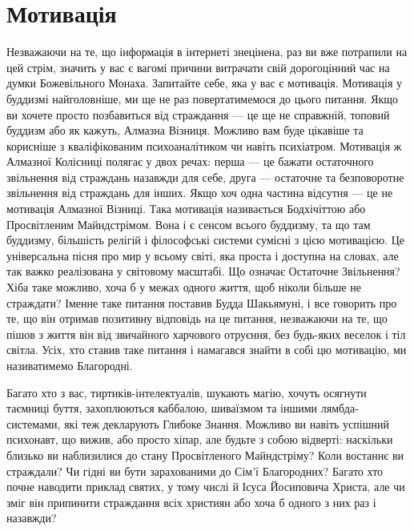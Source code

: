\section{Мотивація}

Незважаючи на те, що інформація в інтернеті знецінена,
раз ви вже потрапили на цей стрім, значить у вас є вагомі
причини витрачати свій дорогоцінний час на думки Божевільного
Монаха. Запитайте себе, яка у вас є мотивація. Мотивація
у буддизмі найголовніше, ми ще не раз повертатимемося
до цього питання. Якщо ви хочете просто позбавиться від
страждання --- це ще не справжній, топовий буддизм або
як кажуть, Алмазна Візниця. Можливо вам буде
цікавіше та корисніше з кваліфікованим психоаналітиком
чи навіть психіатром. Мотивація ж Алмазної Колісниці
полягає у двох речах: перша --- це бажати остаточного
звільнення від страждань назавжди для себе, друга ---
остаточне та безповоротне звільнення від страждань
для інших. Якщо хоч одна частина відсутня --- це не мотивація
Алмазної Візниці. Така мотивація називається Бодхічіттою
або Просвітленим Майндстрімом. Вона і є сенсом всього
буддизму, та що там буддизму, більшість релігій і
філософські системи сумісні з цією мотивацією. Це
універсальна пісня про мир у всьому світі, яка проста
і доступна на словах, але так важко реалізована у світовому
масштабі. Що означає Остаточне Звільнення? Хіба
таке можливо, хоча б у межах одного життя, щоб ніколи
більше не страждати? Іменне таке питання поставив Будда
Шакьямуні, і все говорить про те, що він отримав позитивну
відповідь на це питання, незважаючи на те, що пішов
з життя він від звичайного харчового отруєння,
без будь-яких веселок і тіл світла. Усіх, хто ставив
таке питання і намагався знайти в собі цю мотивацію,
ми називатимемо Благородні.

Багато хто з вас, тиртиків-інтелектуалів, шукають
магію, хочуть осягнути таємниці буття, захоплюються
каббалою, шиваїзмом та іншими лямбда-системами,
які теж декларують Глибоке Знання. Можливо ви
навіть успішний психонавт, що вижив, або просто хіпар,
але будьте з собою відверті: наскільки близько
ви наблизилися до стану Просвітленого Майндстріму?
Коли востаннє ви страждали? Чи гідні ви бути зарахованими
до Сім'ї Благородних? Багато хто почне наводити
приклад святих, у тому числі й Ісуса Йосиповича Христа,
але чи зміг він припинити страждання всіх християн
або хоча б одного з них раз і назавжди?

